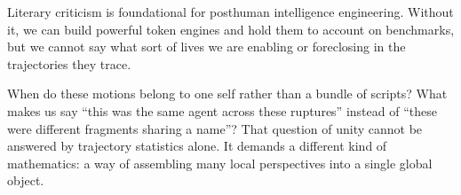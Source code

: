 Literary criticism is foundational for posthuman intelligence engineering. Without it, we can build powerful token engines and hold them to account on benchmarks, but we cannot say what sort of lives we are enabling or foreclosing in the trajectories they trace.

\bigskip

When do these motions belong to one self rather than a bundle of scripts? What makes us say ``this was the same agent across these ruptures'' instead of ``these were different fragments sharing a name''? That question of unity cannot be answered by trajectory statistics alone. It demands a different kind of mathematics: a way of assembling many local perspectives into a single global object.